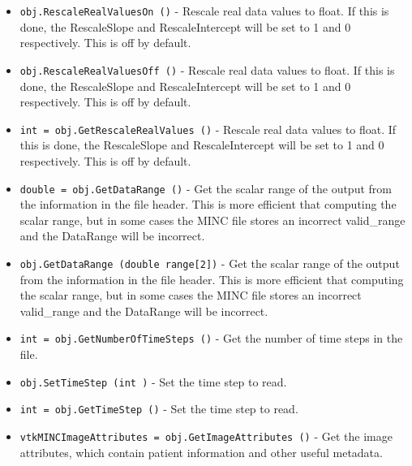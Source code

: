 \begin{itemize}
\item  \verb|obj.RescaleRealValuesOn ()| -  Rescale real data values to float.  If this is done, the
 RescaleSlope and RescaleIntercept will be set to 1 and 0
 respectively.  This is off by default.

\item  \verb|obj.RescaleRealValuesOff ()| -  Rescale real data values to float.  If this is done, the
 RescaleSlope and RescaleIntercept will be set to 1 and 0
 respectively.  This is off by default.

\item  \verb|int = obj.GetRescaleRealValues ()| -  Rescale real data values to float.  If this is done, the
 RescaleSlope and RescaleIntercept will be set to 1 and 0
 respectively.  This is off by default.

\item  \verb|double = obj.GetDataRange ()| -  Get the scalar range of the output from the information in
 the file header.  This is more efficient that computing the
 scalar range, but in some cases the MINC file stores an
 incorrect valid\_range and the DataRange will be incorrect.

\item  \verb|obj.GetDataRange (double range[2])| -  Get the scalar range of the output from the information in
 the file header.  This is more efficient that computing the
 scalar range, but in some cases the MINC file stores an
 incorrect valid\_range and the DataRange will be incorrect.

\item  \verb|int = obj.GetNumberOfTimeSteps ()| -  Get the number of time steps in the file.

\item  \verb|obj.SetTimeStep (int )| -  Set the time step to read.

\item  \verb|int = obj.GetTimeStep ()| -  Set the time step to read.

\item  \verb|vtkMINCImageAttributes = obj.GetImageAttributes ()| -  Get the image attributes, which contain patient information and
 other useful metadata.

\end{itemize}
